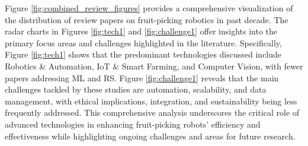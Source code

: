 \documentclass[a4paper,fleqn]{cas-dc}
\begin{document}
Figure \ref{fig:combined_review_figures} provides a comprehensive visualization of the distribution of review papers on fruit-picking robotics in past decade. The radar charts in Figures \ref{fig:tech1} and \ref{fig:challenge1} offer insights into the primary focus areas and challenges highlighted in the literature. Specifically, Figure \ref{fig:tech1} shows that the predominant technologies discussed include Robotics \& Automation, IoT \& Smart Farming, and Computer Vision, with fewer papers addressing ML and RS. Figure \ref{fig:challenge1} reveals that the main challenges tackled by these studies are automation, scalability, and data management, with ethical implications, integration, and sustainability being less frequently addressed. 
This comprehensive analysis underscores the critical role of advanced technologies in enhancing fruit-picking robots' efficiency and effectiveness while highlighting ongoing challenges and areas for future research.

\end{document}
